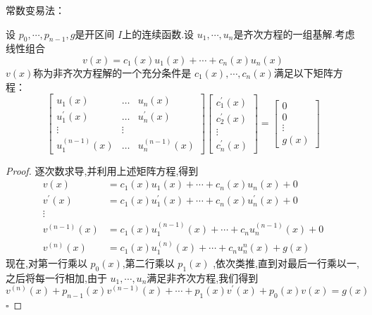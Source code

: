 \documentclass[lang=cn,12pt,color=green,fontset=none]{elegantbook}
\begin{document}
\noindent\begin{large}
    常数变易法：
\end{large}
\begin{proposition}
    设 \(   p_0,\cdots,p_{n-1} ,g  \)是开区间 \(  I  \)上的连续函数.设 \(   u_1,\cdots,u_n   \)是齐次方程的一组基解.考虑线性组合 \[
    v\left( x \right)=c_1\left( x \right)u_1\left( x \right)+ \cdots + c_{n}\left( x \right)u_{n}\left( x \right)     
    \]   \(  v\left( x \right)   \)称为非齐次方程解的一个充分条件是 \(  c_1\left( x \right),\cdots ,c_{n}\left( x \right)    \)满足以下矩阵方程：\[
        \begin{bmatrix}u_1(x)&\ldots&u_n(x)\\u_1^{\prime}(x)&\ldots&u_n^{\prime}(x)\\\vdots&\vdots\\u_1^{(n-1)}(x)&\ldots&u_n^{(n-1)}(x)\end{bmatrix}\begin{bmatrix}c_1^{\prime}(x)\\c_2^{\prime}(x)\\\vdots\\c_n^{\prime}(x)\end{bmatrix}=\begin{bmatrix}0\\0\\\vdots\\g(x)\end{bmatrix}
    \]  
\end{proposition}
\begin{proof}
    逐次数求导,并利用上述矩阵方程,得到
    \[
    \begin{aligned}
    v\left( x \right)& = c_1\left( x \right)u_1\left( x \right)+ \cdots + c_{n}\left( x \right)u_{n}\left( x \right)+ 0\\ 
     v^{\prime} \left( x \right)&=c_1\left( x \right)u_1^{\prime} \left( x \right)+ \cdots + c_{n}\left( x \right)u_{n}^{\prime} \left( x \right)+ 0       \\ 
      \vdots\\ 
       v^{\left( n-1 \right) } \left( x \right)  & = c_1\left( x \right)u_1^{\left( n-1 \right) }\left( x \right)+ \cdots + c_{n}u_{n}^{\left( n-1 \right) }\left( x \right)+ 0\\ 
        v^{\left( n \right) }\left( x \right)& =     c_1\left( x \right)u_1^{\left( n \right) }\left( x \right)+ \cdots + c_{n}u_{n}^{n}\left( x \right)+ g\left( x \right)      
    \end{aligned}
    \]
    现在,对第一行乘以 \(  p_0 \left( x \right)  \),第二行乘以 \(  p_1\left( x \right)   \)  ,依次类推,直到对最后一行乘以一,之后将每一行相加,由于 \(   u_1,\cdots,u_n   \)满足非齐次方程,我们得到 \[
    v^{\left( n \right) }\left( x \right)+  p_{n-1}\left( x \right)v^{\left( n-1 \right) }\left( x \right)+ \cdots + p_1\left( x \right)v^{\prime} \left( x \right)+ p_0\left( x \right)v\left( x \right)=g\left( x \right)        
    \] 
    \hfill $\square$
\end{proof}   
\end{document}
